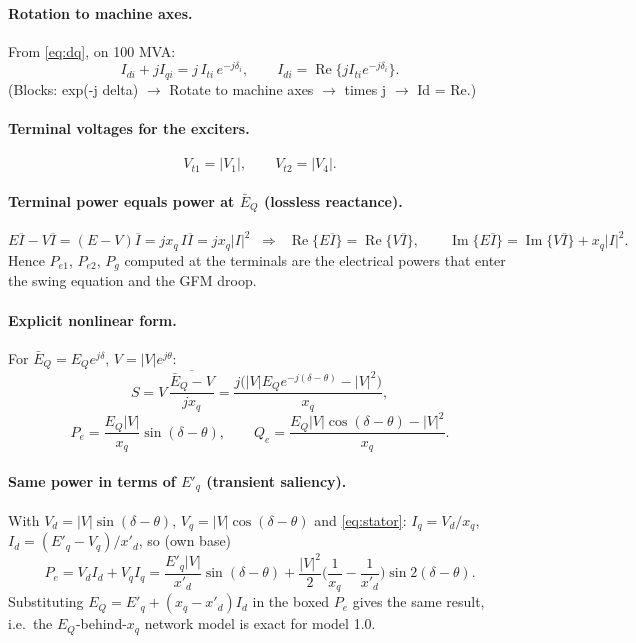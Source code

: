 \documentclass[11pt,a4paper]{article}
\numberwithin{equation}{section}
\newcommand{\cj}[1]{\overline{#1}}
\newcommand{\re}{\operatorname{Re}}
\newcommand{\im}{\operatorname{Im}}
\newcommand{\blk}[1]{\textsf{#1}}
\begin{document}
\paragraph{Rotation to machine axes.} From \eqref{eq:dq}, on 100 MVA:
\begin{equation}
\boxed{I_{di} + jI_{qi} = j\,I_{ti}\,e^{-j\delta_i},\qquad I_{di} = \re\{jI_{ti}e^{-j\delta_i}\}.}
\end{equation}
(Blocks: \blk{exp(-j delta)} $\to$ \blk{Rotate to machine axes} $\to$ \blk{times j} $\to$ \blk{Id = Re}.)
\paragraph{Terminal voltages for the exciters.}
\begin{equation}
V_{t1} = |V_1|,\qquad V_{t2} = |V_4| .
\end{equation}

\paragraph{Terminal power equals power at $\bar E_Q$ (lossless reactance).}
\begin{equation}
E\cj I - V\cj I = (E-V)\cj I = jx_q\,I\cj I = jx_q|I|^2
\;\;\Longrightarrow\;\;
\re\{E\cj I\} = \re\{V\cj I\},\qquad \im\{E\cj I\} = \im\{V\cj I\} + x_q|I|^2 .
\end{equation}
Hence $P_{e1}$, $P_{e2}$, $P_g$ computed at the terminals are the electrical powers that enter the swing equation and the GFM droop.

\paragraph{Explicit nonlinear form.}
For $\bar E_Q=E_Qe^{j\delta}$, $V=|V|e^{j\theta}$:
\begin{equation}
S = V\,\cj{\frac{\bar E_Q-V}{jx_q}}
= \frac{j\big(|V|E_Qe^{-j(\delta-\theta)}-|V|^2\big)}{x_q},
\end{equation}
\begin{equation}
\boxed{P_e = \frac{E_Q|V|}{x_q}\sin(\delta-\theta),\qquad
Q_e = \frac{E_Q|V|\cos(\delta-\theta) - |V|^2}{x_q}.}
\end{equation}
\paragraph{Same power in terms of $E'_q$ (transient saliency).}
With $V_d = |V|\sin(\delta-\theta)$, $V_q = |V|\cos(\delta-\theta)$ and \eqref{eq:stator}: $I_q = V_d/x_q$, $I_d = (E'_q - V_q)/x'_d$, so (own base)
\begin{equation}
P_e = V_dI_d + V_qI_q
= \frac{E'_q|V|}{x'_d}\sin(\delta-\theta) + \frac{|V|^2}{2}\Big(\frac{1}{x_q}-\frac{1}{x'_d}\Big)\sin 2(\delta-\theta).
\end{equation}
Substituting $E_Q = E'_q + (x_q-x'_d)I_d$ in the boxed $P_e$ gives the same result, i.e.\ the $E_Q$-behind-$x_q$ network model is exact for model 1.0.
\end{document}
